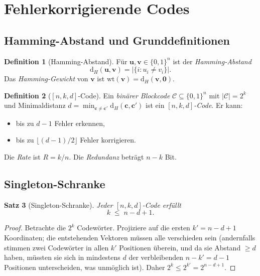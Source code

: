 \documentclass[12pt,a4paper]{amsart}
\newtheorem{theorem}{Satz}[section]
\theoremstyle{definition}
\newtheorem{definition}[theorem]{Definition}
\theoremstyle{remark}
\newcommand{\wt}{\mathrm{wt}}
\newcommand{\dist}{\mathrm{d}}
\begin{document}
\section{Fehlerkorrigierende Codes}

\subsection{Hamming-Abstand und Grunddefinitionen}

\begin{definition}[Hamming-Abstand]
Für $\mathbf{u}, \mathbf{v} \in \{0,1\}^n$ ist der \emph{Hamming-Abstand}
\[
  \dist_H(\mathbf{u}, \mathbf{v}) = |\{i : u_i \neq v_i\}|.
\]
Das \emph{Hamming-Gewicht} von $\mathbf{v}$ ist $\wt(\mathbf{v}) =
\dist_H(\mathbf{v}, \mathbf{0})$.
\end{definition}

\begin{definition}[{$[n,k,d]$}-Code]
Ein \emph{binärer Blockcode} $\mathcal{C} \subseteq \{0,1\}^n$ mit
$|\mathcal{C}| = 2^k$ und Minimaldistanz $d = \min_{\mathbf{c} \neq \mathbf{c}'}
\dist_H(\mathbf{c}, \mathbf{c}')$ ist ein \emph{$[n,k,d]$-Code}. Er kann:
\begin{itemize}
  \item bis zu $d-1$ Fehler erkennen,
  \item bis zu $\lfloor (d-1)/2 \rfloor$ Fehler korrigieren.
\end{itemize}
Die \emph{Rate} ist $R = k/n$. Die \emph{Redundanz} beträgt $n - k$ Bit.
\end{definition}

\subsection{Singleton-Schranke}

\begin{theorem}[Singleton-Schranke]\label{satz:singleton}
Jeder $[n,k,d]$-Code erfüllt
\[
  k \;\leq\; n - d + 1.
\]
\end{theorem}
\begin{proof}
Betrachte die $2^k$ Codewörter. Projiziere auf die ersten $k' = n-d+1$
Koordinaten; die entstehenden Vektoren müssen alle verschieden sein (andernfalls
stimmen zwei Codewörter in allen $k'$ Positionen überein, und da sie
Abstand $\geq d$ haben, müssten sie sich in mindestens $d$ der verbleibenden
$n-k'=d-1$ Positionen unterscheiden, was unmöglich ist). Daher
$2^k \leq 2^{k'} = 2^{n-d+1}$.
\end{proof}
\end{document}
